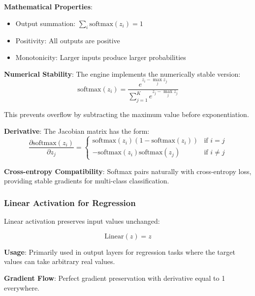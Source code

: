 \documentclass[11pt,a4paper]{report}
\begin{document}
\textbf{Mathematical Properties}:
\begin{itemize}
\item Output summation: $\sum_{i} \text{softmax}(z_i) = 1$
\item Positivity: All outputs are positive
\item Monotonicity: Larger inputs produce larger probabilities
\end{itemize}

\textbf{Numerical Stability}: The engine implements the numerically stable version:
\begin{equation}
\text{softmax}(z_i) = \frac{e^{z_i - \max_j z_j}}{\sum_{j=1}^K e^{z_j - \max_j z_j}}
\end{equation}

This prevents overflow by subtracting the maximum value before exponentiation.

\textbf{Derivative}: The Jacobian matrix has the form:
\begin{equation}
\frac{\partial \text{softmax}(z_i)}{\partial z_j} = \begin{cases}
\text{softmax}(z_i)(1 - \text{softmax}(z_i)) & \text{if } i = j \\
-\text{softmax}(z_i)\text{softmax}(z_j) & \text{if } i \neq j
\end{cases}
\end{equation}

\textbf{Cross-entropy Compatibility}: Softmax pairs naturally with cross-entropy loss, providing stable gradients for multi-class classification.

\subsubsection{Linear Activation for Regression}

Linear activation preserves input values unchanged:

\begin{equation}
\text{Linear}(z) = z
\end{equation}

\textbf{Usage}: Primarily used in output layers for regression tasks where the target values can take arbitrary real values.

\textbf{Gradient Flow}: Perfect gradient preservation with derivative equal to 1 everywhere.
\end{document}
